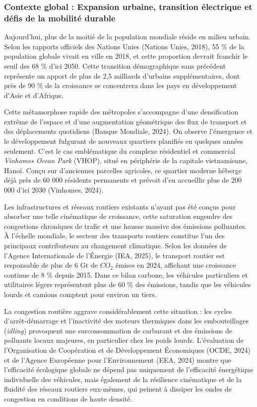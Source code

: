 \documentclass[10pt, a4paper]{article}
\begin{document}
\subsubsection{Contexte global : Expansion urbaine, transition
électrique et défis de la mobilité
durable}\label{contexte-global-expansion-urbaine-transition-uxe9lectrique-et-duxe9fis-de-la-mobilituxe9-durable}

Aujourd'hui, plus de la moitié de la population mondiale réside en
milieu urbain. Selon les rapports officiels des Nations Unies (Nations
Unies, 2018), 55 \% de la population globale vivait en ville en 2018, et
cette proportion devrait franchir le seuil des 68 \% d'ici 2050. Cette
transition démographique sans précédent représente un apport de plus de
2,5 milliards d'urbains supplémentaires, dont près de 90 \% de la
croissance se concentrera dans les pays en développement d'Asie et
d'Afrique.

Cette métamorphose rapide des métropoles s'accompagne d'une
densification extrême de l'espace et d'une augmentation géométrique des
flux de transport et des déplacements quotidiens (Banque Mondiale,
2024). On observe l'émergence et le développement fulgurant de nouveaux
quartiers planifiés en quelques années seulement. C'est le cas
emblématique du complexe résidentiel et commercial \emph{Vinhomes Ocean
Park} (VHOP), situé en périphérie de la capitale vietnamienne, Hanoï.
Conçu sur d'anciennes parcelles agricoles, ce quartier moderne héberge
déjà près de 60 000 résidents permanents et prévoit d'en accueillir plus
de 200 000 d'ici 2030 (Vinhomes, 2024).

Les infrastructures et réseaux routiers existants n'ayant pas été conçus
pour absorber une telle cinématique de croissance, cette saturation
engendre des congestions chroniques de trafic et une hausse massive des
émissions polluantes. À l'échelle mondiale, le secteur des transports
routiers constitue l'un des principaux contributeurs au changement
climatique. Selon les données de l'Agence Internationale de l'Énergie
(IEA, 2025), le transport routier est responsable de plus de 6 Gt de
\(CO_2\) émises en 2024, affichant une croissance continue de 8 \%
depuis 2015. Dans ce bilan carbone, les véhicules particuliers et
utilitaires légers représentent plus de 60 \% des émissions, tandis que
les véhicules lourds et camions comptent pour environ un tiers.

La congestion routière aggrave considérablement cette situation : les
cycles d'arrêt-démarrage et l'inactivité des moteurs thermiques dans les
embouteillages (\emph{idling}) provoquent une surconsommation de
carburant et des émissions de polluants locaux majeures, en particulier
chez les poids lourds. L'évaluation de l'Organisation de Coopération et
de Développement Économiques (OCDE, 2024) et de l'Agence Européenne pour
l'Environnement (EEA, 2024) montre que l'efficacité écologique globale
ne dépend pas uniquement de l'efficacité énergétique individuelle des
véhicules, mais également de la résilience cinématique et de la fluidité
des réseaux routiers eux-mêmes, qui peinent à dissiper les ondes de
congestion en conditions de haute densité.
\end{document}
